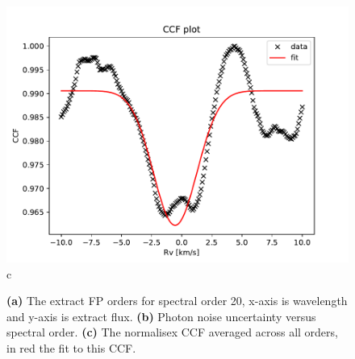 \begin{figure}
\begin{center}
\begin{minipage}{.495\textwidth}
\begin{center}
\includegraphics[width=\textwidth]{Figures/cal_ccf_e2ds_3.pdf}
c
\end{center}
\end{minipage}%
\end{center}

\caption{\textbf{(a)} The extract FP orders for spectral order 20, x-axis is wavelength and y-axis is extract flux. \textbf{(b)} Photon noise uncertainty versus spectral order. \textbf{(c)} The normalisex CCF averaged across all orders, in red the fit to this CCF. \label{figure:cal_ccf_spirou}}
\end{figure}